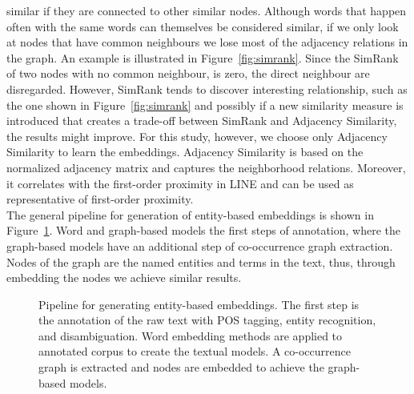 similar if they are connected to other similar nodes. Although words that happen often with the same words can themselves be considered similar, if we only look at nodes that have common neighbours we lose most of the adjacency relations in the graph. An example is illustrated in Figure~\ref{fig:simrank}. Since the SimRank of two nodes with no common neighbour, is zero, the direct neighbour are disregarded. However, SimRank tends to discover interesting relationship, such as the one shown in Figure~\ref{fig:simrank} and possibly if a new similarity measure is introduced that creates a trade-off between SimRank and Adjacency Similarity, the results might improve. For this study, however, we choose only Adjacency Similarity to learn the embeddings. Adjacency Similarity is based on the normalized adjacency matrix and captures the neighborhood relations. Moreover, it correlates with the first-order proximity in LINE and can be used as representative of first-order proximity. \\

The general pipeline for generation of entity-based embeddings is shown in Figure~\ref{fig:entity_emebddings_pipline}. Word and graph-based models the first steps of annotation, where the graph-based models have an additional step of co-occurrence graph extraction. Nodes of the graph are the named entities and terms in the text, thus, through embedding the nodes we achieve similar results. 
\begin{figure}
\centering 
\resizebox{0.97\textwidth}{0.32\textwidth}{      

}
\caption{Pipeline for generating entity-based embeddings. The first step is the annotation of the raw text with POS tagging, entity recognition, and disambiguation. Word embedding methods are applied to annotated corpus to create the textual models. A co-occurrence graph is extracted and nodes are embedded to achieve the graph-based models.   }
\label{fig:entity_emebddings_pipline}
\end{figure}
